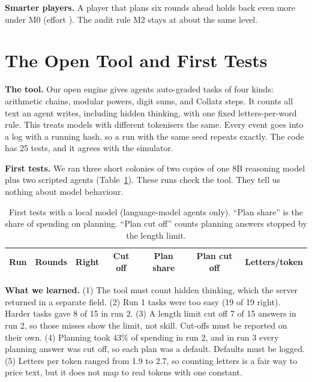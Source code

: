 \documentclass[conference]{IEEEtran}
\theoremstyle{plain}
\begin{document}
\textbf{Smarter players.} A player that plans six rounds ahead holds back even more under M0 (effort \NMidEffLook{}). The audit rule M2 stays at about the same level.

\section{The Open Tool and First Tests}
\label{sec:engine}
\textbf{The tool.} Our open engine gives agents auto-graded tasks of four kinds: arithmetic chains, modular powers, digit sums, and Collatz steps. It counts all text an agent writes, including hidden thinking, with one fixed letters-per-word rule. This treats models with different tokenisers the same. Every event goes into a log with a running hash, so a run with the same seed repeats exactly. The code has 25 tests, and it agrees with the simulator.

\textbf{First tests.} We ran three short colonies of two copies of one 8B reasoning model plus two scripted agents (Table~\ref{tab:live}). These runs check the tool. They tell us nothing about model behaviour.

\begin{table}[!t]
\caption{First tests with a local model (language-model agents only). ``Plan share'' is the share of spending on planning. ``Plan cut off'' counts planning answers stopped by the length limit.}
\label{tab:live}
\centering
\small
\begin{tabular}{@{}rrccccc@{}}
\toprule
Run & Rounds & Right & Cut off & Plan share & Plan cut off & Letters/token \\
\midrule

\bottomrule
\end{tabular}
\end{table}

\textbf{What we learned.}
(1) The tool must count hidden thinking, which the server returned in a separate field.
(2) Run 1 tasks were too easy (19 of 19 right). Harder tasks gave 8 of 15 in run 2.
(3) A length limit cut off 7 of 15 answers in run 2, so those misses show the limit, not skill. Cut-offs must be reported on their own.
(4) Planning took 43\% of spending in run 2, and in run 3 every planning answer was cut off, so each plan was a default. Defaults must be logged.
(5) Letters per token ranged from 1.9 to 2.7, so counting letters is a fair way to price text, but it does not map to real tokens with one constant.
\end{document}
